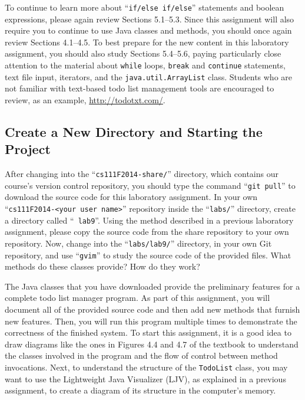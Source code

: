 To continue to learn more about ``{\tt if/else if/else}'' statements and boolean expressions, please again review
Sections 5.1--5.3. Since this assignment will also require you to continue to use Java classes and methods, you should
once again review Sections 4.1--4.5.  To best prepare for the new content in this laboratory assignment, you should also
study Sections 5.4--5.6, paying particularly close attention to the material about {\tt while} loops, {\tt break} and
{\tt continue} statements, text file input, iterators, and the {\tt java.util.ArrayList} class. Students who are not
familiar with text-based todo list management tools are encouraged to review, as an example, \url{http://todotxt.com/}.

\vspace{-0.1in}
\subsection*{Create a New Directory and Starting the Project}
\vspace{-0.05in}

After changing into the ``{\tt cs111F2014-share/}'' directory, which contains our course's version control repository,
you should type the command ``{\tt git pull}'' to download the source code for this laboratory assignment.  In your own
``{\tt cs111F2014-<your user name>}'' repository inside the ``{\tt labs/}'' directory, create a directory called ``{\tt
  lab9}''. Using the method described in a previous laboratory assignment, please copy the source code from the share
repository to your own repository. Now, change into the ``{\tt labs/lab9/}'' directory, in your own Git repository, and
use ``{\tt gvim}'' to study the source code of the provided files. What methods do these classes provide? How do they
work?

The Java classes that you have downloaded provide the preliminary features for a complete todo list manager program. As
part of this assignment, you will document all of the provided source code and then add new methods that furnish new
features.  Then, you will run this program multiple times to demonstrate the correctness of the finished system. To
start this assignment, it is a good idea to draw diagrams like the ones in Figures 4.4 and 4.7 of the textbook to
understand the classes involved in the program and the flow of control between method invocations. Next, to understand
the structure of the {\tt TodoList} class, you may want to use the Lightweight Java Visualizer (LJV), as explained in a
previous assignment, to create a diagram of its structure in the computer's memory.

